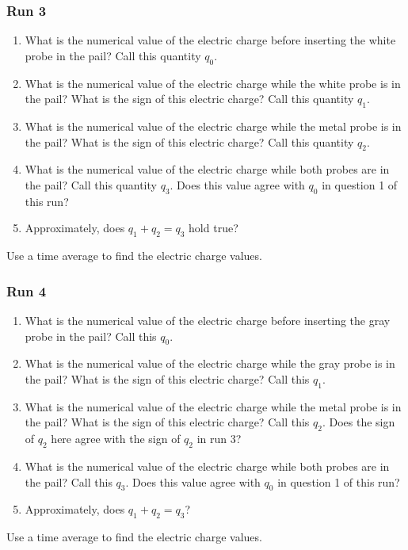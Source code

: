 \subsubsection{Run 3}
\begin{enumerate}
	\item What is the numerical value of the electric charge before inserting the white probe in the pail? Call this quantity $q_{0}$.
	\item What is the numerical value of the electric charge while the white probe is in the pail? What is the sign of this electric charge? Call this quantity $q_{1}$.
	\item What is the numerical value of the electric charge while the metal probe is in the pail? What is the sign of this electric charge? Call this quantity $q_{2}$.
	\item What is the numerical value of the electric charge while both probes are in the pail? Call this quantity $q_{3}$. Does this value agree with $q_{0}$ in question 1 of this run?
	\item Approximately, does $q_{1} + q_{2} = q_{3}$ hold true?
\end{enumerate}
Use a time average to find the electric charge values.
\subsubsection{Run 4}
\begin{enumerate}
	\item What is the numerical value of the electric charge before inserting the gray probe in the pail? Call this $q_{0}$.
	\item What is the numerical value of the electric charge while the gray probe is in the pail? What is the sign of this electric charge? Call this $q_{1}$.
	\item What is the numerical value of the electric charge while the metal probe is in the pail? What is the sign of this electric charge? Call this $q_{2}$. Does the sign of $q_{2}$ here agree with the sign of $q_{2}$ in run 3?
	\item What is the numerical value of the electric charge while both probes are in the pail? Call this $q_{3}$. Does this value agree with $q_{0}$ in question 1 of this run?
	\item Approximately, does $q_{1} + q_{2} = q_{3}$?
\end{enumerate}
Use a time average to find the electric charge values.
